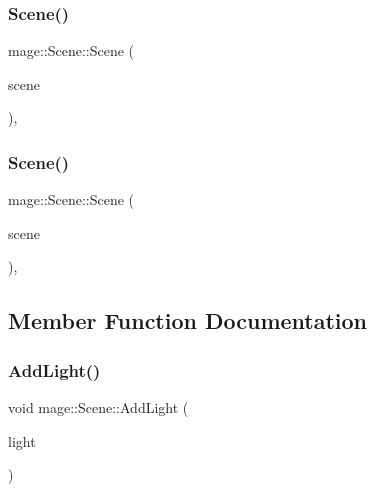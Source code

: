 \hypertarget{classmage_1_1_scene_a88d83ccb2e10549d5370f850b2b4c228}{}\label{classmage_1_1_scene_a88d83ccb2e10549d5370f850b2b4c228} 
\subsubsection{\texorpdfstring{Scene()}{Scene()}\hspace{0.1cm}{\footnotesize\ttfamily [2/3]}}
{\footnotesize\ttfamily mage\+::\+Scene\+::\+Scene (\begin{DoxyParamCaption}\item[{const \hyperlink{classmage_1_1_scene}{Scene} \&}]{scene }\end{DoxyParamCaption})\hspace{0.3cm}{\ttfamily [protected]}, {\ttfamily [delete]}}

\hypertarget{classmage_1_1_scene_a35b8fc4242c2348e53014b96416fc3d3}{}\label{classmage_1_1_scene_a35b8fc4242c2348e53014b96416fc3d3} 
\subsubsection{\texorpdfstring{Scene()}{Scene()}\hspace{0.1cm}{\footnotesize\ttfamily [3/3]}}
{\footnotesize\ttfamily mage\+::\+Scene\+::\+Scene (\begin{DoxyParamCaption}\item[{\hyperlink{classmage_1_1_scene}{Scene} \&\&}]{scene }\end{DoxyParamCaption})\hspace{0.3cm}{\ttfamily [protected]}, {\ttfamily [default]}}



\subsection{Member Function Documentation}
\hypertarget{classmage_1_1_scene_a6ce8182afe3c1f39249ec08b62aee317}{}\label{classmage_1_1_scene_a6ce8182afe3c1f39249ec08b62aee317} 
\subsubsection{\texorpdfstring{Add\+Light()}{AddLight()}\hspace{0.1cm}{\footnotesize\ttfamily [1/2]}}
{\footnotesize\ttfamily void mage\+::\+Scene\+::\+Add\+Light (\begin{DoxyParamCaption}\item[{\hyperlink{namespacemage_a1e01ae66713838a7a67d30e44c67703e}{Shared\+Ptr}$<$ \hyperlink{namespacemage_a1724c6e6b6b5ba535cdd967cbbb4a669}{Omni\+Light\+Node} $>$}]{light }\end{DoxyParamCaption})\hspace{0.3cm}{\ttfamily [private]}}

